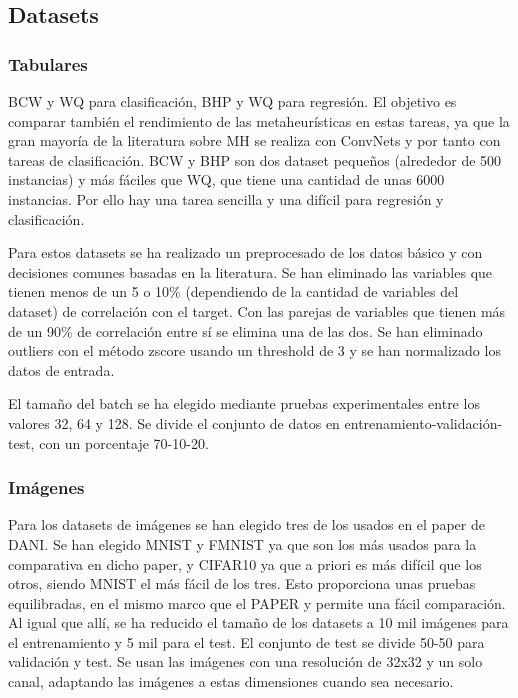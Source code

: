 


\subsection{Datasets}


\subsubsection{Tabulares}

BCW y WQ para clasificación, BHP y WQ para regresión. El objetivo es comparar también el rendimiento de las metaheurísticas en estas tareas, ya que la gran mayoría de la literatura sobre MH se realiza con ConvNets y por tanto con tareas de clasificación. BCW y BHP son dos dataset pequeños (alrededor de 500 instancias) y más fáciles que WQ, que tiene una cantidad de unas 6000 instancias. Por ello hay una tarea sencilla y una difícil para regresión y clasificación.

Para estos datasets se ha realizado un preprocesado de los datos básico y con decisiones comunes basadas en la literatura. Se han eliminado las variables que tienen menos de un 5 o 10\% (dependiendo de la cantidad de variables del dataset) de correlación con el target. Con las parejas de variables que tienen más de un 90\% de correlación entre sí se elimina una de las dos. Se han eliminado outliers con el método zscore usando un threshold de 3 y se han normalizado los datos de entrada.

El tamaño del batch se ha elegido mediante pruebas experimentales entre los valores 32, 64 y 128. Se divide el conjunto de datos en entrenamiento-validación-test, con un porcentaje 70-10-20.



\subsubsection{Imágenes}

Para los datasets de imágenes se han elegido tres de los usados en el paper de DANI. Se han elegido MNIST y FMNIST ya que son los más usados para la comparativa en dicho paper, y CIFAR10 ya que a priori es más difícil que los otros, siendo MNIST el más fácil de los tres. Esto proporciona unas pruebas equilibradas, en el mismo marco que el PAPER y permite una fácil comparación. Al igual que allí, se ha reducido el tamaño de los datasets a 10 mil imágenes para el entrenamiento y 5 mil para el test. El conjunto de test se divide 50-50 para validación y test. Se usan las imágenes con una resolución de 32x32 y un solo canal, adaptando las imágenes a estas dimensiones cuando sea necesario.


